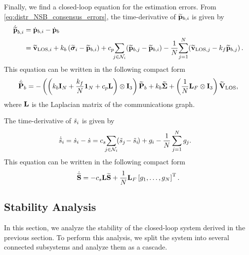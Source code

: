 Finally, we find a closed-loop equation for the estimation errors.
From \eqref{eq:distr_NSB_consensus_errors}, the time-derivative of $\widetilde{\mathbf{p}}_{b, i}$ is given by
    \begin{align}
        \dot{\widetilde{\mathbf{p}}}_{b, i} &= \dot{\mathbf{p}}_{b, i} - \dot{\mathbf{p}}_b \\
        &= \widetilde{\mathbf{v}}_{{\rm LOS}, i} + k_b\left(\widetilde{\bm{\sigma}}_i - \widetilde{\mathbf{p}}_{b, i}\right) +  c_p \!\! \sum_{j \in \mathcal{N}_i} \! \left(\widetilde{\mathbf{p}}_{b, j} - \widetilde{\mathbf{p}}_{b, i}\right) - \frac{1}{N}\!\sum_{j=1}^N\! \left(\widetilde{\mathbf{v}}_{{\rm LOS}, j} - k_f \widetilde{\mathbf{p}}_{b, j}\right). \nonumber
    \end{align}
This equation can be written in the following compact form
\begin{equation}
        \dot{\widetilde{\mathbf{P}}}_{b} = - \left(\left(k_b \mathbf{I}_N + \frac{k_f}{N}\mathbf{1}_N + c_p \mathbf{L}\right) \otimes \mathbf{I}_3\right) \widetilde{\mathbf{P}}_{b} + k_b \widetilde{\bm{\Sigma}} + \left(\frac{1}{N}\mathbf{L}_{F} \otimes \mathbf{I}_3\right) \widetilde{\mathbf{V}}_{\rm LOS},
    \label{eq:distr_NSB_P_tilde_CL}
\end{equation}
where $\mathbf{L}$ is the Laplacian matrix of the communications graph.

The time-derivative of $\Tilde{s}_{i}$ is given by
\begin{equation}
    \begin{split}
        \dot{\Tilde{s}}_{i} &= \dot{s}_i - \dot{s} = c_s \!\! \sum_{j \in \mathcal{N}_i}\!\! \left(\Tilde{s}_{j\!} - \Tilde{s}_{i\!}\right) + g_i - \frac{1}{N}\sum_{j=1}^N g_j.
    \end{split}
\end{equation}
This equation can be written in the following compact form
\begin{equation}
    \dot{\widetilde{\mathbf{S}}} = -c_s \mathbf{L} \widetilde{\mathbf{S}} + \frac{1}{N} \mathbf{L}_{F} \left[g_1, \ldots, g_N\right]^{\mathrm{T}}.
    \label{eq:distr_NSB_S_tilde_CL}
\end{equation}

\subsection{Stability Analysis}
In this section, we analyze the stability of the closed-loop system derived in the previous section.
To perform this analysis, we split the system into several connected subsystems and analyze them as a cascade.

